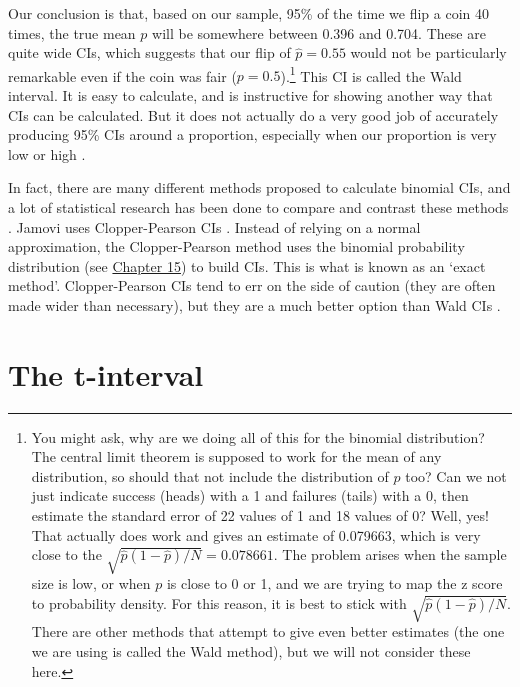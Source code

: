 \documentclass[
]{scrbook}
\begin{document}
Our conclusion is that, based on our sample, 95\% of the time we flip a coin 40 times, the true mean \(p\) will be somewhere between 0.396 and 0.704.
These are quite wide CIs, which suggests that our flip of \(\hat{p} = 0.55\) would not be particularly remarkable even if the coin was fair (\(p = 0.5\)).\footnote{You might ask, why are we doing all of this for the binomial distribution? The central limit theorem is supposed to work for the mean of any distribution, so should that not include the distribution of \(p\) too? Can we not just indicate success (heads) with a 1 and failures (tails) with a 0, then estimate the standard error of 22 values of 1 and 18 values of 0? Well, yes! That actually does work and gives an estimate of 0.079663, which is very close to the \(\sqrt{\hat{p}(1-\hat{p})/N} = 0.078661\). The problem arises when the sample size is low, or when \(p\) is close to 0 or 1, and we are trying to map the z score to probability density. For this reason, it is best to stick with \(\sqrt{\hat{p}(1-\hat{p})/N}\). There are other methods that attempt to give even better estimates (the one we are using is called the Wald method), but we will not consider these here.}
This CI is called the Wald interval.
It is easy to calculate, and is instructive for showing another way that CIs can be calculated.
But it does not actually do a very good job of accurately producing 95\% CIs around a proportion, especially when our proportion is very low or high \citep{Schilling2014, Andersson2023}.

In fact, there are many different methods proposed to calculate binomial CIs, and a lot of statistical research has been done to compare and contrast these methods \citep{Reed2007, Thulin2014, Schilling2014}.
Jamovi uses Clopper-Pearson CIs \citep{Clopper1934}.
Instead of relying on a normal approximation, the Clopper-Pearson method uses the binomial probability distribution (see \protect\hyperlink{Chapter_15}{Chapter 15}) to build CIs.
This is what is known as an `exact method'.
Clopper-Pearson CIs tend to err on the side of caution (they are often made wider than necessary), but they are a much better option than Wald CIs \citep{Reed2007}.

\hypertarget{Chapter_19}{%
\chapter{The t-interval}\label{Chapter_19}}
\end{document}
